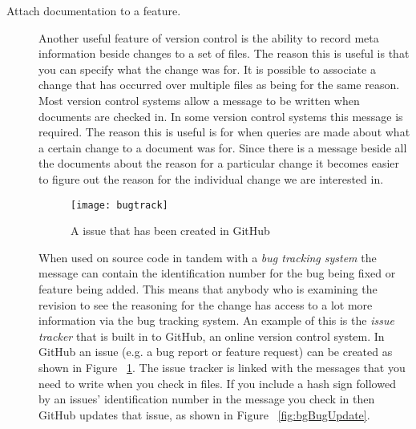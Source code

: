 \begin{description}

  \item [Attach documentation to a feature.]
  Another useful feature of version control is the ability to record meta information beside changes to a set of files.
  The reason this is useful is that you can specify what the change was for.
  It is possible to associate a change that has occurred over multiple files as being for the same reason.
  Most version control systems allow a message to be written when documents are checked in.
  In some version control systems this message is required.
  The reason this is useful is for when queries are made about what a certain change to a document was for.
  Since there is a message beside all the documents about the reason for a particular change it becomes easier to figure out the reason for the individual change we are interested in. 

  \begin{figure}[!t]
   \begin{center}
    \texttt{[image: bugtrack]}
   \end{center}
   \caption{A issue that has been created in GitHub}
   \label{fig:bgBugTrack}
  \end{figure}

  When used on source code in tandem with a \emph{bug tracking system} the message can contain the identification number for the bug being fixed or feature being added.
  This means that anybody who is examining the revision to see the reasoning for the change has access to a lot more information via the bug tracking system.
  An example of this is the \emph{issue tracker} that is built in to GitHub, an online version control system. In GitHub an issue (e.g. a bug report or feature request) can be created as shown in Figure ~\ref{fig:bgBugTrack}. 
  The issue tracker is linked with the messages that you need to write when you check in files.
  If you include a hash sign followed by an issues' identification number in the message you check in then GitHub updates that issue, as shown in Figure ~\ref{fig:bgBugUpdate}.


\end{description}
